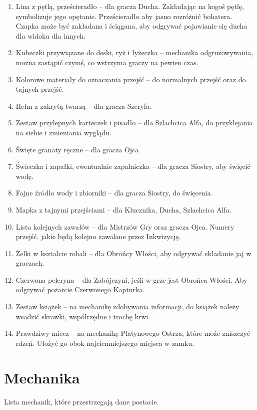 \begin{enumerate}
		\item Lina z pętlą, prześcieradło -- dla gracza Ducha. Zakładając na kogoś pętlę, symbolizuje jego opętanie. Prześcieradło aby jasno rozróżnić bohatera. Czapka może być zakładana i ściągana, aby odgrywać pojawianie się ducha dla widoku dla innych.
		\item Kubeczki przywiązane do deski, ryż i łyżeczka -- mechanika odgruzowywania, można zastąpić czymś, co wstrzyma graczy na pewien czas.
		\item Kolorowe materiały do oznaczania przejść -- do normalnych przejść oraz do tajnych przejść.
		\item Hełm z zakrytą twarzą -- dla gracza Szeryfa.
		\item Zestaw przylepnych karteczek i pisadło -- dla Szlachcica Alfa, do przyklejania na siebie i zmieniania wyglądu.
		\item Święte granaty ręczne -- dla gracza Ojca
		\item Świeczka i zapałki, ewentualnie zapalniczka -- dla gracza Siostry, aby święcić wodę.
		\item Fajne źródło wody i zbiorniki -- dla gracza Siostry, do święcenia.
		\item Mapka z tajnymi przejściami -- dla Klucznika, Ducha, Szlachcica Alfa.
		\item Lista kolejnych zawałów -- dla Mistrzów Gry oraz gracza Ojca. Numery przejść, jakie będą kolejno zawalane przez Inkwizycję.
		\item Żelki w kształcie robali -- dla Obrońcy Włości, aby odgrywać składanie jaj w graczach.
		\item Czerwona peleryna -- dla Zabójczyni, jeśli w grze jest Obrońca Włości. Aby odgrywać pożarcie Czerwonego Kapturka.
		\item Zestaw książek -- na mechanikę zdobywania informacji, do książek należy wsadzić skrawki, współrzędne i trochę krwi.
		\item Prawdziwy miecz -- na mechanikę Platynowego Ostrza, które może zniszczyć rdzeń. Ułożyć go obok najciemniejszego miejsca w zamku.
	\end{enumerate}
	
\section{Mechanika}
	Lista mechanik, które przestrzegają dane postacie.
	
